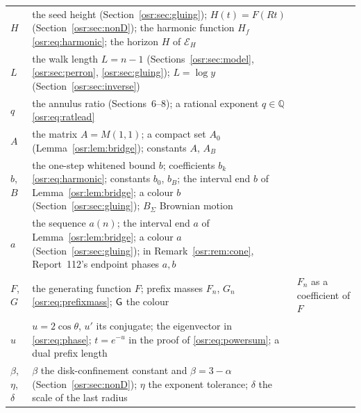 \documentclass[11pt,letterpaper]{article}
\newcommand{\Q}{\mathbb Q}\newcommand{\R}{\mathbb R}\newcommand{\Z}{\mathbb Z}
\numberwithin{equation}{section}
\begin{document}
\begin{longtable}{@{}>{\raggedright\arraybackslash}p{0.55in}>{\raggedright\arraybackslash}p{3.75in}>{\raggedright\arraybackslash}p{1.85in}@{}}
$H$ & the seed height (Section~\ref{osr:sec:gluing}); $H(t)=F(Rt)$
 (Section~\ref{osr:sec:nonD}); the harmonic function $H_f$
 \eqref{osr:eq:harmonic}; the horizon $H$ of $\mathcal E_H$ & \\
$L$ & the walk length $L=n-1$ (Sections~\ref{osr:sec:model},
 \ref{osr:sec:perron}, \ref{osr:sec:gluing}); $L=\log y$
 (Section~\ref{osr:sec:inverse}) & \\
$q$ & the annulus ratio (Sections~6--8); a rational exponent
 $q\in\Q$ \eqref{osr:eq:ratlead} & \\
$A$ & the matrix $A=M(1,1)$; a compact set $A_0$
 (Lemma~\ref{osr:lem:bridge}); constants $A$, $A_B$ & \\
$b$, $B$ & the one-step whitened bound $b$; coefficients $b_k$
 \eqref{osr:eq:harmonic}; constants $b_0$, $b_B$; the interval end $b$ of
 Lemma~\ref{osr:lem:bridge}; a colour $b$ (Section~\ref{osr:sec:gluing});
 $B_\Sigma$ Brownian motion & \\
$a$ & the sequence $a(n)$; the interval end $a$ of
 Lemma~\ref{osr:lem:bridge}; a colour $a$ (Section~\ref{osr:sec:gluing});
 in Remark~\ref{osr:rem:cone}, Report~112's endpoint phases $a,b$ & \\
$F$, $G$ & the generating function $F$; prefix masses $F_n$, $G_n$
 \eqref{osr:eq:prefixmass}; $\mathsf G$ the colour & $F_n$ as a coefficient of
 $F$\\
$u$ & $u=2\cos\theta$, $u'$ its conjugate; the eigenvector in
 \eqref{osr:eq:phase}; $t=e^{-u}$ in the proof of
 \eqref{osr:eq:powersum}; a dual prefix length & \\
$\beta$, $\eta$, $\delta$ & $\beta$ the disk-confinement constant and
 $\beta=3-\alpha$ (Section~\ref{osr:sec:nonD}); $\eta$ the exponent
 tolerance; $\delta$ the scale of the last radius & \\
\bottomrule
\end{longtable}
\endgroup
\end{document}

